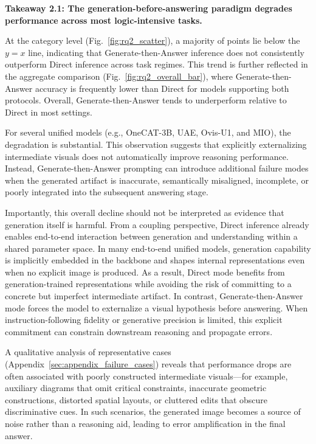 \documentclass{article}
\theoremstyle{plain}
\theoremstyle{definition}
\theoremstyle{remark}
\begin{document}
\textbf{Takeaway 2.1: The generation-before-answering paradigm degrades performance across most logic-intensive tasks.}


At the category level (Fig.~\ref{fig:rq2_scatter}), a majority of points lie below the $y=x$ line, indicating that Generate-then-Answer inference does not consistently outperform Direct inference across task regimes. This trend is further reflected in the aggregate comparison (Fig.~\ref{fig:rq2_overall_bar}), where Generate-then-Answer accuracy is frequently lower than Direct for models supporting both protocols. Overall, Generate-then-Answer tends to underperform relative to Direct in most settings.

For several unified models (e.g., OneCAT-3B, UAE, Ovis-U1, and MIO), the degradation is substantial. This observation suggests that explicitly externalizing intermediate visuals does not automatically improve reasoning performance. Instead, Generate-then-Answer prompting can introduce additional failure modes when the generated artifact is inaccurate, semantically misaligned, incomplete, or poorly integrated into the subsequent answering stage.

Importantly, this overall decline should not be interpreted as evidence that generation itself is harmful. From a coupling perspective, Direct inference already enables end-to-end interaction between generation and understanding within a shared parameter space. In many end-to-end unified models, generation capability is implicitly embedded in the backbone and shapes internal representations even when no explicit image is produced. As a result, Direct mode benefits from generation-trained representations while avoiding the risk of committing to a concrete but imperfect intermediate artifact. In contrast, Generate-then-Answer mode forces the model to externalize a visual hypothesis before answering. When instruction-following fidelity or generative precision is limited, this explicit commitment can constrain downstream reasoning and propagate errors.

A qualitative analysis of representative cases (Appendix~\ref{sec:appendix_failure_cases}) reveals that performance drops are often associated with poorly constructed intermediate visuals—for example, auxiliary diagrams that omit critical constraints, inaccurate geometric constructions, distorted spatial layouts, or cluttered edits that obscure discriminative cues. In such scenarios, the generated image becomes a source of noise rather than a reasoning aid, leading to error amplification in the final answer.
\end{document}
